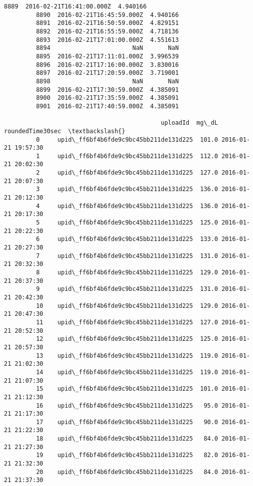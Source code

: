\documentclass[11pt]{article}
\begin{document}
\begin{Verbatim}[commandchars=\\\{\}]
         8889  2016-02-21T16:41:00.000Z  4.940166   
         8890  2016-02-21T16:45:59.000Z  4.940166   
         8891  2016-02-21T16:50:59.000Z  4.829151   
         8892  2016-02-21T16:55:59.000Z  4.718136   
         8893  2016-02-21T17:01:00.000Z  4.551613   
         8894                       NaN       NaN   
         8895  2016-02-21T17:11:01.000Z  3.996539   
         8896  2016-02-21T17:16:00.000Z  3.830016   
         8897  2016-02-21T17:20:59.000Z  3.719001   
         8898                       NaN       NaN   
         8899  2016-02-21T17:30:59.000Z  4.385091   
         8900  2016-02-21T17:35:59.000Z  4.385091   
         8901  2016-02-21T17:40:59.000Z  4.385091   
         
                                            uploadId  mg\_dL    roundedTime30sec  \textbackslash{}
         0     upid\_ff6bf4b6fde9c9bc45bb211de131d225  101.0 2016-01-21 19:57:30   
         1     upid\_ff6bf4b6fde9c9bc45bb211de131d225  112.0 2016-01-21 20:02:30   
         2     upid\_ff6bf4b6fde9c9bc45bb211de131d225  127.0 2016-01-21 20:07:30   
         3     upid\_ff6bf4b6fde9c9bc45bb211de131d225  136.0 2016-01-21 20:12:30   
         4     upid\_ff6bf4b6fde9c9bc45bb211de131d225  136.0 2016-01-21 20:17:30   
         5     upid\_ff6bf4b6fde9c9bc45bb211de131d225  125.0 2016-01-21 20:22:30   
         6     upid\_ff6bf4b6fde9c9bc45bb211de131d225  133.0 2016-01-21 20:27:30   
         7     upid\_ff6bf4b6fde9c9bc45bb211de131d225  131.0 2016-01-21 20:32:30   
         8     upid\_ff6bf4b6fde9c9bc45bb211de131d225  129.0 2016-01-21 20:37:30   
         9     upid\_ff6bf4b6fde9c9bc45bb211de131d225  131.0 2016-01-21 20:42:30   
         10    upid\_ff6bf4b6fde9c9bc45bb211de131d225  129.0 2016-01-21 20:47:30   
         11    upid\_ff6bf4b6fde9c9bc45bb211de131d225  127.0 2016-01-21 20:52:30   
         12    upid\_ff6bf4b6fde9c9bc45bb211de131d225  125.0 2016-01-21 20:57:30   
         13    upid\_ff6bf4b6fde9c9bc45bb211de131d225  119.0 2016-01-21 21:02:30   
         14    upid\_ff6bf4b6fde9c9bc45bb211de131d225  119.0 2016-01-21 21:07:30   
         15    upid\_ff6bf4b6fde9c9bc45bb211de131d225  101.0 2016-01-21 21:12:30   
         16    upid\_ff6bf4b6fde9c9bc45bb211de131d225   95.0 2016-01-21 21:17:30   
         17    upid\_ff6bf4b6fde9c9bc45bb211de131d225   90.0 2016-01-21 21:22:30   
         18    upid\_ff6bf4b6fde9c9bc45bb211de131d225   84.0 2016-01-21 21:27:30   
         19    upid\_ff6bf4b6fde9c9bc45bb211de131d225   82.0 2016-01-21 21:32:30   
         20    upid\_ff6bf4b6fde9c9bc45bb211de131d225   84.0 2016-01-21 21:37:30   

\end{Verbatim}
\end{document}
